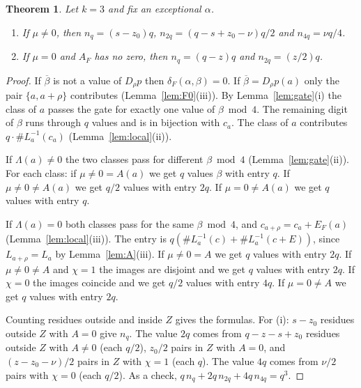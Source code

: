 \documentclass[11pt]{article}
\newtheorem{theorem}{Theorem}[section]
\theoremstyle{definition}
\theoremstyle{remark}
\newcommand{\ol}[1]{\overline{#1}}
\begin{document}
\begin{theorem}\label{thm:S12}
Let $k=3$ and fix an exceptional $\alpha$.
\begin{enumerate}[label=(\roman*)]
\item If $\mu\ne0$, then $n_q=(s-z_0)q$, $n_{2q}=(q-s+z_0-\nu)q/2$ and $n_{4q}=\nu q/4$.
\item If $\mu=0$ and $A_F$ has no zero, then $n_q=(q-z)q$ and $n_{2q}=(z/2)q$.
\end{enumerate}
\end{theorem}
\begin{proof}
If $\ol\beta$ is not a value of $D_\rho p$ then $\delta_F(\alpha,\beta)=0$. If $\ol\beta=D_\rho p(a)$ only the
pair $\{a,a+\rho\}$ contributes (Lemma~\ref{lem:F0}(iii)). By Lemma~\ref{lem:gate}(i) the class of $a$
passes the gate for exactly one value of $\beta\bmod4$. The remaining digit of $\beta$ runs through $q$
values and is in bijection with $c_a$. The class of $a$ contributes $q\cdot\#L_a^{-1}(c_a)$
(Lemma~\ref{lem:local}(ii)).

If $\Lambda(a)\ne0$ the two classes pass for different $\beta\bmod4$ (Lemma~\ref{lem:gate}(ii)). For each
class: if $\mu\ne0=A(a)$ we get $q$ values $\beta$ with entry $q$. If $\mu\ne0\ne A(a)$ we get $q/2$ values
with entry $2q$. If $\mu=0\ne A(a)$ we get $q$ values with entry $q$.

If $\Lambda(a)=0$ both classes pass for the same $\beta\bmod4$, and $c_{a+\rho}=c_a+E_F(a)$
(Lemma~\ref{lem:local}(iii)). The entry is $q(\#L_a^{-1}(c)+\#L_a^{-1}(c+E))$, since $L_{a+\rho}=L_a$ by Lemma~\ref{lem:A}(iii). If $\mu\ne0=A$ we get $q$ values
with entry $2q$. If $\mu\ne0\ne A$ and $\chi=1$ the images are disjoint and we get $q$ values with entry $2q$.
If $\chi=0$ the images coincide and we get $q/2$ values with entry $4q$. If $\mu=0\ne A$ we get $q$ values
with entry $2q$.

Counting residues outside and inside $Z$ gives the formulas. For (i): $s-z_0$ residues outside $Z$ with
$A=0$ give $n_q$. The value $2q$ comes from $q-z-s+z_0$ residues outside $Z$ with $A\ne0$ (each $q/2$),
$z_0/2$ pairs in $Z$ with $A=0$, and $(z-z_0-\nu)/2$ pairs in $Z$ with $\chi=1$ (each $q$). The value $4q$
comes from $\nu/2$ pairs with $\chi=0$ (each $q/2$). As a check, $q\,n_q+2q\,n_{2q}+4q\,n_{4q}=q^3$.
\end{proof}
\end{document}
